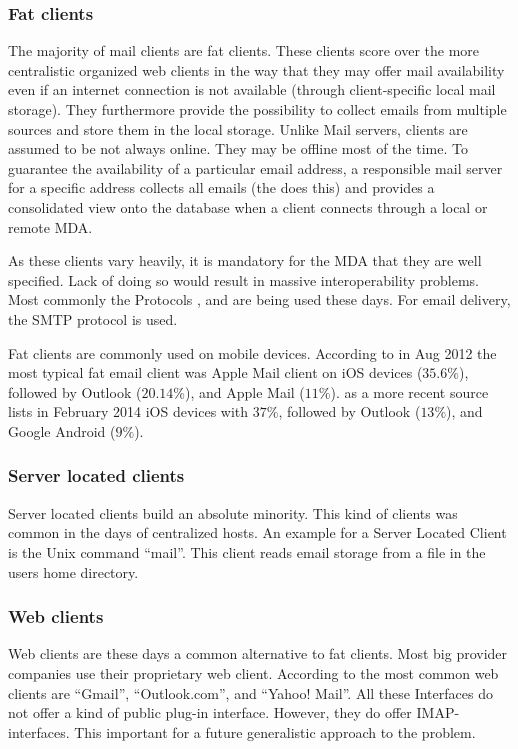 \subsubsection{Fat clients}
The majority of mail clients are fat clients. These clients score over the more centralistic organized web clients in the way that they may offer mail availability even if an internet connection is not available (through client-specific local mail storage). They furthermore provide the possibility to collect emails from multiple sources and store them in the local storage. Unlike Mail servers, clients are assumed to be not always online. They may be offline most of the time. To guarantee the availability of a particular email address, a responsible mail server for a specific address collects all emails (the  does this) and provides a consolidated view onto the database when a client connects through a local or remote MDA.

As these clients vary heavily, it is mandatory for the MDA that they are well specified. Lack of doing so would result in massive interoperability problems. Most commonly the Protocols ,  and  are being used these days. For email delivery, the SMTP protocol is used. 

Fat clients are commonly used on mobile devices. According to  \cite{clientDistribution} in Aug 2012 the most typical fat email client was Apple Mail client on iOS devices ($35.6\%$), followed by Outlook ($20.14\%$), and Apple Mail ($11\%$). \cite{clientDistribution2} as a more recent source lists in February 2014 iOS devices with $37\%$, followed by Outlook ($13\%$), and  Google Android ($9\%$).

\subsubsection{Server located clients}
Server located clients build an absolute minority. This kind of clients was common in the days of centralized hosts. An example for a Server Located Client is the Unix command ``mail''. This client reads email storage from a file in the users home directory.

\subsubsection{Web clients}
Web clients are these days a common alternative to fat clients. Most big provider companies use their proprietary web client. According to \cite{clientDistribution2} the most common web clients are "`Gmail"', "`Outlook.com"', and "`Yahoo! Mail"'. All these Interfaces do not offer a kind of public plug-in interface. However,  they do offer IMAP-interfaces. This important for a future generalistic approach to the problem.

